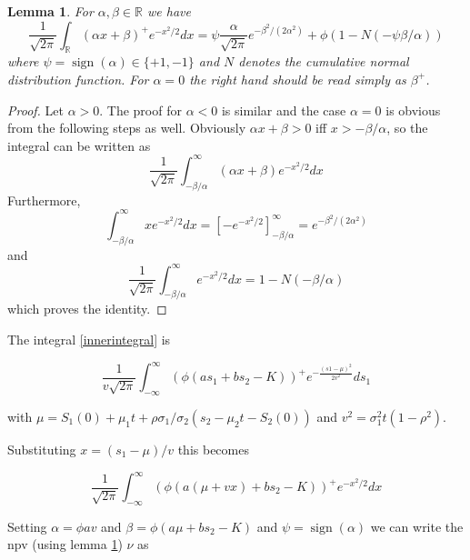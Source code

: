 \documentclass{amsart}
\theoremstyle{plain}
\newtheorem{lemma}{Lemma}
\numberwithin{equation}{section}
\DeclareMathOperator{\sign}{sign}
\begin{document}
\begin{lemma}
\label{linearnormalintegral}
For $\alpha, \beta \in \mathbb{R}$ we have
\begin{equation}
\frac{1}{\sqrt{2 \pi}} \int_{\mathbb{R}} (\alpha x+\beta)^+ e^{-x^2/2} dx = \psi \frac{\alpha}{\sqrt{2\pi}}e^{-\beta^2/(2\alpha^2)} + \phi (1-N(-\psi\beta/\alpha))
\end{equation}
where $\psi = \sign(\alpha) \in \{+1,-1\}$ and $N$ denotes the cumulative normal distribution function. For $\alpha=0$ the right hand should be read simply as $\beta^+$.
\end{lemma}
\begin{proof}
Let $\alpha>0$. The proof for $\alpha<0$ is similar and the case $\alpha=0$ is obvious from the following steps as well. Obviously $\alpha x+\beta > 0$ iff $x > -\beta/\alpha$, so the integral can be written as
\begin{equation}
\frac{1}{\sqrt{2 \pi}} \int_{-\beta/\alpha}^{\infty} (\alpha x+\beta) e^{-x^2/2} dx 
\end{equation}
Furthermore,
\begin{equation}
\int_{-\beta/\alpha}^\infty x e^{-x^2/2} dx = \left[ -e^{-x^2/2} \right]_{-\beta/\alpha}^\infty = e^{-\beta^2/(2\alpha^2)}
\end{equation}
and
\begin{equation}
\frac{1}{\sqrt{2\pi}}\int_{-\beta/\alpha}^\infty e^{-x^2/2} dx = 1 - N(-\beta/\alpha)
\end{equation}
which proves the identity.
\end{proof}

The integral \ref{innerintegral} is

\begin{equation}
\frac{1}{v\sqrt{2\pi}} \int_{-\infty}^\infty (\phi(as_1+bs_2-K))^+ e^{-\frac{(s1-\mu)^2}{2v^2}} ds_1
\end{equation}

with $\mu=S_1(0)+\mu_1t+\rho\sigma_1/\sigma_2(s_2-\mu_2t-S_2(0))$ and $v^2=\sigma_1^2t(1-\rho^2)$.

Substituting $x=(s_1-\mu)/v$ this becomes

\begin{equation}
\frac{1}{\sqrt{2\pi}}\int_{-\infty}^{\infty} \left(\phi (a(\mu+vx)+bs_2-K)\right)^+ e^{-x^2/2} dx
\end{equation}

Setting $\alpha=\phi a v$ and $\beta=\phi (a \mu + b s_2 - K)$ and $\psi = \sign(\alpha)$ we can write the npv (using lemma \ref{linearnormalintegral}) $\nu$ as 
\end{document}
